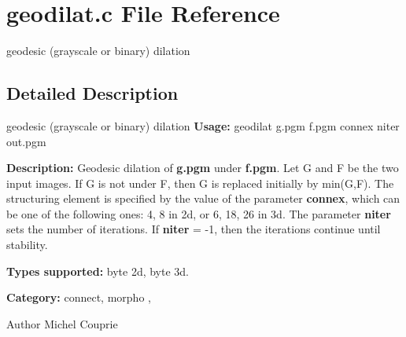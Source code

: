 \section{geodilat.c File Reference}
\label{geodilat_8c}


geodesic (grayscale or binary) dilation  




\subsection{Detailed Description}
geodesic (grayscale or binary) dilation {\bfseries Usage:} geodilat g.pgm f.pgm connex niter out.pgm

{\bfseries Description:} Geodesic dilation of {\bfseries g.pgm} under {\bfseries f.pgm}. Let G and F be the two input images. If G is not under F, then G is replaced initially by min(G,F). The structuring element is specified by the value of the parameter {\bfseries connex}, which can be one of the following ones: 4, 8 in 2d, or 6, 18, 26 in 3d. The parameter {\bfseries niter} sets the number of iterations. If {\bfseries niter} = -\/1, then the iterations continue until stability.

{\bfseries Types supported:} byte 2d, byte 3d.

{\bfseries Category:} connect, morpho ,

\begin{DoxyAuthor}{Author}
Michel Couprie 
\end{DoxyAuthor}
